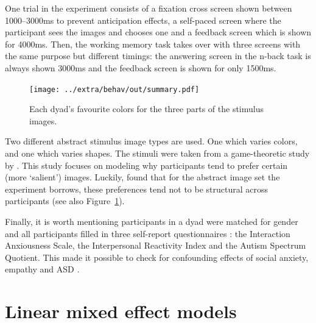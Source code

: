One trial in the experiment consists of a fixation cross screen shown between
1000--3000ms to prevent anticipation effects, a self-paced screen where the
participant sees the images and chooses one and a feedback screen which is shown
for 4000ms. Then, the working memory task takes over with three screens with
the same purpose but different timings: the answering screen in the n-back
task is always shown 3000ms and the feedback screen is shown for only 1500ms.

\begin{figure}[!htpb]
  \texttt{[image: ../extra/behav/out/summary.pdf]}
  \caption{Each dyad's favourite colors for the three parts of the stimulus images.}
  \label{fig:colors}
\end{figure}

Two different abstract stimulus image types are used. One which varies colors,
and one which varies shapes. The stimuli were taken from a game-theoretic
study by \textcite{alberti_salience_2012}. This study focuses on modeling why
participants tend to prefer certain (more `salient') images. Luckily,
\textcite{alberti_salience_2012} found that for the abstract image set the
experiment borrows, these preferences tend not to be structural across
participants (see also Figure~\ref{fig:colors}).

Finally, it is worth mentioning participants in a dyad were matched for gender
and all participants filled in three self-report questionnaires
\parencite{christodoulou_effects_2021}: the Interaction Anxiousness Scale,
the Interpersonal Reactivity Index and the Autism Spectrum Quotient. This
made it possible to check for confounding effects of social anxiety, empathy
and ASD \parencite{akcay_role_2021}.


\section{Linear mixed effect models}
\label{app:lme}

